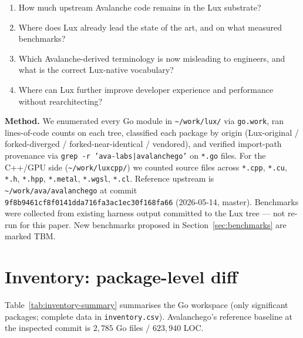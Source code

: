 \documentclass[11pt,a4paper]{article}
\begin{document}
\begin{enumerate}[leftmargin=1.4em,topsep=0.2em,itemsep=0.1em]
  \item How much upstream Avalanche code remains in the Lux substrate?
  \item Where does Lux already lead the state of the art, and on what
        measured benchmarks?
  \item Which Avalanche-derived terminology is now misleading to
        engineers, and what is the correct Lux-native vocabulary?
  \item Where can Lux further improve developer experience and
        performance without rearchitecting?
\end{enumerate}

\noindent\textbf{Method.} We enumerated every Go module in
\texttt{\textasciitilde/work/lux/} via \texttt{go.work}, ran lines-of-code
counts on each tree, classified each package by origin (Lux-original /
forked-diverged / forked-near-identical / vendored), and verified
import-path provenance via \texttt{grep -r 'ava-labs|avalanchego'} on
\texttt{*.go} files. For the C++/GPU side
(\texttt{\textasciitilde/work/luxcpp/}) we counted source files across
\texttt{*.cpp}, \texttt{*.cu}, \texttt{*.h}, \texttt{*.hpp},
\texttt{*.metal}, \texttt{*.wgsl}, \texttt{*.cl}. Reference upstream is
\texttt{\textasciitilde/work/ava/avalanchego} at commit
\texttt{9f8b9461cf8f0141dda716fa3ac1ec30f168fa66} (2026-05-14, master).
Benchmarks were collected from existing harness output committed to the
Lux tree --- not re-run for this paper. New benchmarks proposed in
Section~\ref{sec:benchmarks} are marked TBM.

\section{Inventory: package-level diff}
\label{sec:inventory}

Table~\ref{tab:inventory-summary} summarises the Go workspace (only
significant packages; complete data in
\texttt{inventory.csv}). Avalanchego's reference baseline at the
inspected commit is $2{,}785$ Go files / $623{,}940$ LOC.
\end{document}
